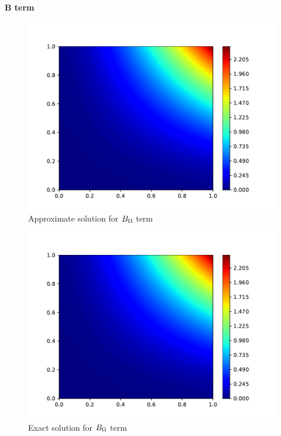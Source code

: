 \paragraph{B term}
\begin{figure}[H]
    \includegraphics[height=0.4\textheight]{media/enstrophy-transport-terms/C-term-approx.pdf}
    \caption{Approximate solution for $B_{\Omega}$ term}
    \label{fig:b-approx}
\end{figure}
\begin{figure}[H]
    \includegraphics[height=0.4\textheight]{media/enstrophy-transport-terms/C-term-exact.pdf}
    \caption{Exact solution for $B_{\Omega}$ term}
    \label{fig:b-exact}
\end{figure}
